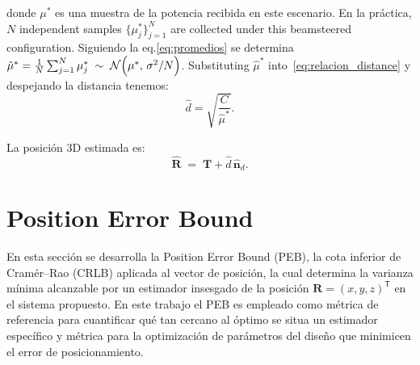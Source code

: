 \documentclass[lettersize,journal]{IEEEtran}
\begin{document}
donde $\mu^*$ es una muestra de la potencia recibida en este escenario. En la práctica, $N$ independent samples $\{\mu^{*}_j\}_{j=1}^N$ are collected under this beamsteered configuration. Siguiendo la eq.\eqref{eq:promedios} se determina $\hat\mu^*=\frac{1}{N}\sum_{j=1}^N \mu^{*}_j \;\sim\; \mathcal N\Bigl(\mu^*,\,\sigma^2/N\Bigr)$. Substituting $\hat\mu^*$ into~\eqref{eq:relacion_distance} y despejando la distancia tenemos:
\begin{equation}
  \hat d  =  \sqrt{\frac{C}{\hat\mu^*}}.
  \label{eq:range_estimate}
\end{equation}

La posición 3D estimada es:
\begin{equation}
  \hat{\mathbf R} 
  \;=\; 
  \mathbf T + \hat d \,\hat{\mathbf n}_d.
  \label{eq:Rhat_full}
\end{equation}

\section{Position Error Bound}
\label{sec:PEB}


En esta sección se desarrolla la Position Error Bound (PEB), la cota inferior de Cramér–Rao (CRLB) aplicada al vector de posición, la cual determina la varianza mínima alcanzable por un estimador insesgado de la posición $\mathbf R=(x,y,z)^{\mathsf T}$ en el sistema propuesto. En este trabajo el PEB es empleado como métrica de referencia para cuantificar qué tan cercano al óptimo se situa un estimador específico y métrica para la optimización de parámetros del diseño que minimicen el error de posicionamiento.
\end{document}
